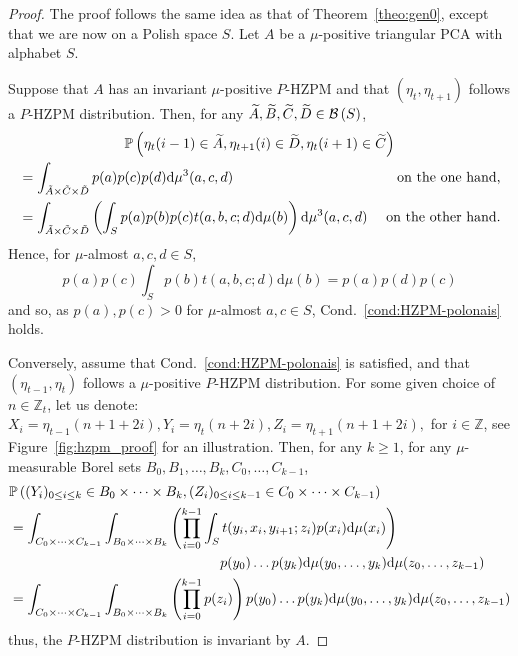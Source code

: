 \documentclass[AHL,Unicode,longabstracts]{cedram}
\let\oldtilde\tilde
\renewcommand*{\tilde}[1]{\mathchoice{\widetilde{#1}}{\widetilde{#1}}{\oldtilde{#1}}{\oldtilde{#1}}}
\newcounter{a}
\newcommand{\Cond}{Cond.}
\newcommand{\diff}[1]{\mathrm{d} #1}
\newcommand{\borel}[1]{\mathcal{B}\left(#1 \right)}
\newcommand{\Z}{\mathbb{Z}}
\newcommand{\Pbb}{\mathbb{P}}
\begin{document}
\begin{proof}
The proof follows the same idea as that of Theorem~\ref{theo:gen0}, except that we are now on a Polish space $S$. Let $A$ be a $\mu$-positive triangular PCA with alphabet $S$.

Suppose that $A$ has an invariant $\mu$-positive $P$-HZPM and that $(\eta_t,\eta_{t+1})$ follows a $P$-HZPM distribution. Then, for any $\tilde A,\tilde B, \tilde C,\tilde D \in \borel{S}$,
\begin{multline*}
\Pbb\left(\eta_t(i-1) \in \tilde A, \eta_{t+1}(i) \in \tilde D, \eta_t(i+1) \in \tilde C\right) \\
\begin{aligned}
& = \int_{\tilde A \times \tilde C \times \tilde D} p(a) p(c) p(d) \diff{\mu^3(a,c,d)} & \text{ on the one hand,}\\
& = \int_{\tilde A \times \tilde C \times \tilde D} \left(\int_S p(a) p(b) p(c) t(a,b,c;d) \diff{\mu(b)} \right) \diff{\mu^3(a,c,d)} & \text{ on the other hand.}
\end{aligned}
\end{multline*}
Hence, for $\mu$-almost $a,c,d \in S$,
\[
p(a) p(c) \int_S p(b) t(a,b,c;d) \diff{\mu(b)} = p(a) p(d) p(c)
\]
and so, as $p(a),p(c) > 0$ for $\mu$-almost $a,c\in S$, \Cond~\ref{cond:HZPM-polonais} holds.


Conversely, assume that \Cond~\ref{cond:HZPM-polonais} is satisfied, and that $(\eta_{t-1},\eta_t)$ follows a $\mu$-positive $P$-HZPM distribution. For some given choice of $n\in\Z_{t}$, let us denote: $X_i=\eta_{t-1}(n+1+2i), Y_i=\eta_{t}(n+2i), Z_i=\eta_{t+1}(n+1+2i),$ for $i\in \Z$, see Figure~\ref{fig:hzpm_proof} for an illustration. Then, for any $k\geq 1$, for any $\mu$-measurable Borel sets $B_0,B_1,\dots,B_k, C_0,\dots,C_{k-1}$,
\begin{align*}
& \Pbb\left((Y_i)_{0 \leq i \leq k} \in B_0\times \cdots \times B_k, (Z_i)_{0 \leq i \leq k-1} \in C_0 \times \cdots \times C_{k-1}\right) \\
& = \int_{C_0 \times \dots \times C_{k-1}} \int_{B_0 \times \dots \times B_{k}} \left(\prod_{i=0}^{k-1} \int_{S} t(y_i,x_{i},y_{i+1};z_i) p(x_{i}) \diff{\mu(x_{i})} \right) \nonumber \\
&\mkern 275mu p(y_0) \dots p(y_{k}) \diff{\mu(y_0,\dots,y_{k})} \diff{\mu(z_0,\dots,z_{k-1})}\\
& = \int_{C_0 \times \dots \times C_{k-1}} \int_{B_0 \times \dots \times B_{k}} \left(\prod_{i=0}^{k-1} p(z_{i}) \right) p(y_0) \dots p(y_{k}) \diff{\mu(y_0,\dots,y_{k})} \diff{\mu(z_0,\dots,z_{k-1})}
\end{align*}
thus, the $P$-HZPM distribution is invariant by $A$.
\end{proof}
\end{document}
